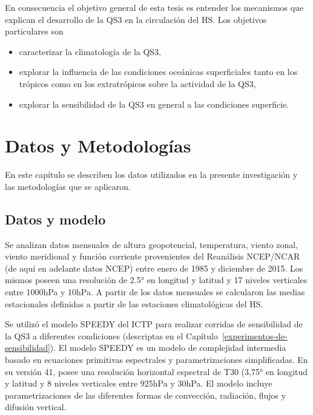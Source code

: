 \documentclass[spanish,a4paper,12pt,oneside]{book}
\providecommand{\tightlist}{%
  \setlength{\itemsep}{0pt}\setlength{\parskip}{0pt}}
\begin{document}
En consecuencia el objetivo general de esta tesis es entender los
mecanismos que explican el desarrollo de la QS3 en la circulación del
HS. Los objetivos particulares son

\begin{itemize}
\tightlist
\item
  caracterizar la climatología de la QS3,
\item
  explorar la influencia de las condiciones oceánicas superficiales
  tanto en los trópicos como en los extratrópicos sobre la actividad de
  la QS3,
\item
  explorar la sensibilidad de la QS3 en general a las condiciones
  superficie.
\end{itemize}

\chapter{Datos y Metodologías}\label{datos-y-metodologias}

En este capítulo se describen los datos utilizados en la presente
investigación y las metodologías que se aplicaron.

\section{Datos y modelo}\label{datos-y-modelo}

Se analizan datos mensuales de altura geopotencial, temperatura, viento
zonal, viento meridional y función corriente provenientes del Reanálisis
NCEP/NCAR \citep{Kalnay1996} (de aquí en adelante datos NCEP) entre
enero de 1985 y diciembre de 2015. Los mismos poseen una resolución de
2.5° en longitud y latitud y 17 niveles verticales entre 1000hPa y
10hPa. A partir de los datos mensuales se calcularon las medias
estacionales definidas a partir de las estaciones climatológicas del HS.

Se utilizó el modelo SPEEDY del ICTP para realizar corridas de
sensibilidad de la QS3 a diferentes condiciones (descriptas en el
Capítulo~\ref{experimentos-de-sensibilidad}). El modelo SPEEDY
\citep{Molteni2003, Kucharski2006} es un modelo de complejidad
intermedia basado en ecuaciones primitivas espectrales y
parametrizaciones simplificadas. En su versión 41, posee una resolución
horizontal espectral de T30 (3,75° en longitud y latitud y 8 niveles
verticales entre 925hPa y 30hPa. El modelo incluye parametrizaciones de
las diferentes formas de convección, radiación, flujos y difusión
vertical.
\end{document}
